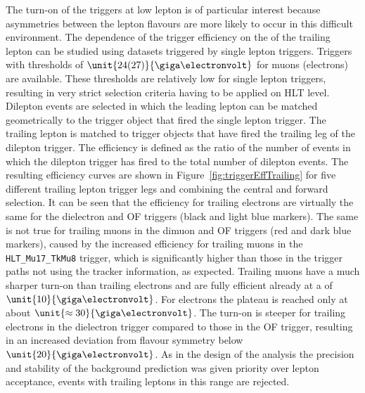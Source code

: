 The turn-on of the triggers at low lepton \pt is of particular interest because asymmetries between the lepton flavours are more likely to occur in this difficult environment. The dependence of the trigger efficiency on the \pt of the trailing lepton can be studied using datasets triggered by single lepton triggers. Triggers with \pt thresholds of $\unit{24(27)}{\giga\electronvolt}$ for muons (electrons) are available. These thresholds are relatively low for single lepton triggers, resulting in very strict selection criteria having to be applied on HLT level. Dilepton events are selected in which the leading lepton can be matched  geometrically to the trigger object that fired the single lepton trigger. The trailing lepton is matched to trigger objects that have fired the trailing leg of the dilepton trigger. The efficiency is defined as the ratio of the number of events in which the dilepton trigger has fired to the total number of dilepton events. The resulting efficiency curves are shown in Figure~\ref{fig:triggerEffTrailing} for five different trailing lepton trigger legs and combining the central and forward selection. It can be seen that the efficiency for trailing electrons are virtually the same for the dielectron and OF triggers (black and light blue markers). The same is not true for trailing muons in the dimuon and OF triggers (red and dark blue markers), caused by the increased efficiency for trailing muons in the \verb+HLT_Mu17_TkMu8+ trigger, which is significantly higher than those in the trigger paths not using the tracker information, as expected. Trailing muons have a much sharper turn-on than trailing electrons and are fully efficient already at a \pt of $\unit{10}{\giga\electronvolt}$. For electrons the plateau is reached only at about $\unit{\approx 30}{\giga\electronvolt}$. The turn-on is steeper for trailing electrons in the dielectron trigger compared to those in the OF trigger, resulting in an increased deviation from flavour symmetry below $\unit{20}{\giga\electronvolt}$. As in the design of the analysis the precision and stability of the background prediction was given priority over lepton acceptance, events with trailing leptons in this \pt range are rejected.  
